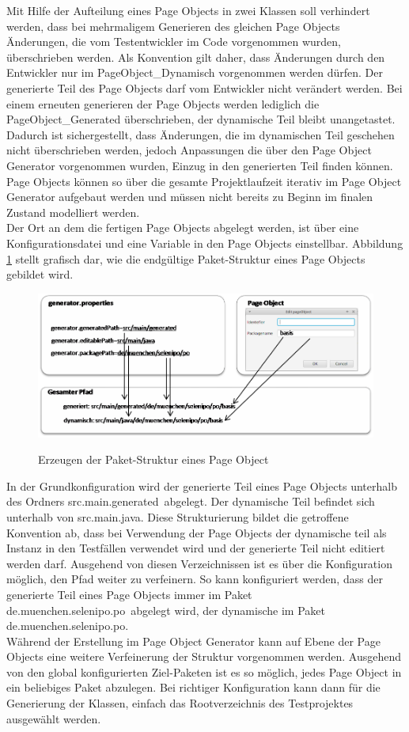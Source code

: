 Mit Hilfe der Aufteilung eines Page Objects in zwei Klassen soll verhindert werden, dass bei mehrmaligem Generieren des gleichen Page Objects Änderungen, die vom Testentwickler im Code vorgenommen wurden, überschrieben werden. Als Konvention gilt daher, dass Änderungen durch den Entwickler nur im PageObject\_Dynamisch vorgenommen werden dürfen. Der generierte Teil des Page Objects darf vom Entwickler nicht verändert werden.
Bei einem erneuten generieren der Page Objects werden lediglich die PageObject\_Generated überschrieben, der dynamische Teil bleibt unangetastet.
Dadurch ist sichergestellt, dass Änderungen, die im dynamischen Teil geschehen nicht überschrieben werden, jedoch Anpassungen die über den Page Object Generator vorgenommen wurden, Einzug in den generierten Teil finden können.
Page Objects können so über die gesamte Projektlaufzeit iterativ im Page Object Generator aufgebaut werden und müssen nicht bereits zu Beginn im finalen Zustand modelliert werden.\\
Der Ort an dem die fertigen Page Objects abgelegt werden, ist über eine Konfigurationsdatei und eine Variable in den Page Objects einstellbar. 
Abbildung \ref{fig:packagepath} stellt grafisch dar, wie die endgültige Paket-Struktur eines Page Objects gebildet wird.
\begin{figure}[htb]
  \centering  
  \includegraphics[scale=0.8]{img/packagePath.png}\\
  \caption{Erzeugen der Paket-Struktur eines Page Object}
  \label{fig:packagepath}
\end{figure}
In der Grundkonfiguration wird der generierte Teil eines Page Objects unterhalb des Ordners \grq src.main.generated\grq\ abgelegt. Der dynamische Teil befindet sich unterhalb von \grq src.main.java\grq.
Diese Strukturierung bildet die getroffene Konvention ab, dass bei Verwendung der Page Objects der dynamische teil als Instanz in den Testfällen verwendet wird und der generierte Teil nicht editiert werden darf.
Ausgehend von diesen Verzeichnissen ist es über die Konfiguration möglich, den Pfad weiter zu verfeinern. So kann konfiguriert werden, dass der generierte Teil eines Page Objects immer im Paket \grq de.muenchen.selenipo.po\grq\ abgelegt wird, der dynamische im Paket \grq de.muenchen.selenipo.po\grq.\\
Während der Erstellung im Page Object Generator kann auf Ebene der Page Objects eine weitere Verfeinerung der Struktur vorgenommen werden. Ausgehend von den global konfigurierten Ziel-Paketen ist es so möglich, jedes Page Object in ein beliebiges Paket abzulegen.
Bei richtiger Konfiguration kann dann für die Generierung der Klassen, einfach das Rootverzeichnis des Testprojektes ausgewählt werden.

